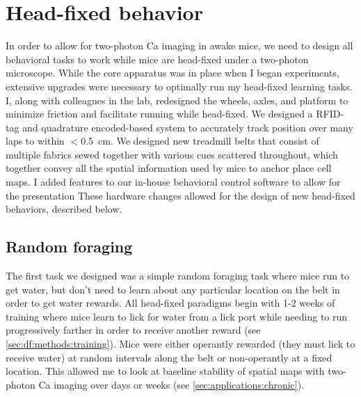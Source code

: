\section{Head-fixed behavior}
\label{sec:intro:techniques:behavior}
In order to allow for two-photon Ca imaging in awake mice, we need to design all behavioral tasks to work while mice are head-fixed under a two-photon microscope.
While the core apparatus was in place when I began experiments, extensive upgrades were necessary to optimally run my head-fixed learning tasks.
I, along with colleagues in the lab, redesigned the wheels, axles, and platform to minimize friction and facilitate running while head-fixed.
We designed a RFID-tag and quadrature encoded-based system to accurately track position over many laps to within $<$0.5~cm.
We designed new treadmill belts that consist of multiple fabrics sewed together with various cues scattered throughout, which together convey all the spatial information used by mice to anchor place cell maps.
I added features to our in-house behavioral control software to allow for the presentation
These hardware changes allowed for the design of new head-fixed behaviors, described below.

\subsection{Random foraging}
The first task we designed was a simple random foraging task where mice run to get water, but don't need to learn about any particular location on the belt in order to get water rewards.
All head-fixed paradigms begin with 1-2 weeks of training where mice learn to lick for water from a lick port while needing to run progressively farther in order to receive another reward (see \autoref{sec:df:methods:training}).
Mice were either operantly rewarded (they must lick to receive water) at random intervals along the belt or non-operantly at a fixed location.
This allowed me to look at baseline stability of spatial maps with two-photon Ca imaging over days or weeks (see \autoref{sec:applications:chronic}).

